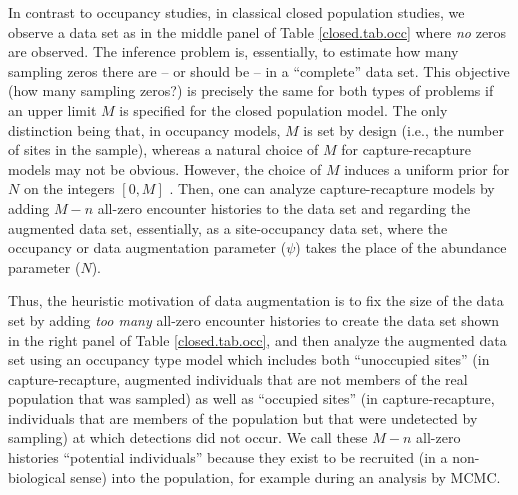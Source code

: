 In contrast to occupancy studies, in classical closed
population studies, we observe a data set as in the middle panel of
Table \ref{closed.tab.occ} where {\it no} zeros are observed. The
inference problem is, essentially, to estimate how many sampling zeros
there are -- or should be -- in a ``complete'' data set. This objective
(how many sampling zeros?) is precisely the same for both types of
problems if an upper limit $M$ is specified for the closed population
model. The only distinction being that, in occupancy models, $M$ is
set by design (i.e., the number of sites in the sample), whereas a natural
choice of $M$ for capture-recapture models may not be
obvious. However, the choice of $M$ induces a uniform prior for $N$ on
the integers $[0,M]$ \citep{royle_etal:2007}. Then, one can analyze
capture-recapture models by adding $M-n$ all-zero encounter histories
to the data set and regarding the augmented data set, essentially, as
a site-occupancy data set, where the occupancy or data augmentation parameter ($\psi$) takes
the place of the abundance parameter ($N$).

Thus, the heuristic motivation of data augmentation is to fix the size
of the data set by adding {\it too many} all-zero encounter histories
to create the data set shown in the right panel of Table
\ref{closed.tab.occ}, and then analyze the augmented data set using an
occupancy type model which includes both ``unoccupied sites'' (in
capture-recapture, augmented individuals that are not members of the
real population that was sampled) as well
as ``occupied sites'' (in capture-recapture, individuals that are
members of the population but that were undetected by sampling) at which detections did not occur. We call these
$M-n$ all-zero histories ``potential individuals'' because they exist
to be recruited (in a non-biological sense) into the population, for
example during an analysis by MCMC.

